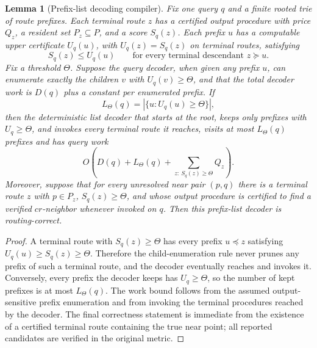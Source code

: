 \documentclass[10pt]{article}
\newtheorem{lemma}[theorem]{Lemma}
\theoremstyle{definition}
\begin{document}
\begin{lemma}[Prefix-list decoding compiler]
   \label{lem:prefix-list-decoder}
   Fix one query \(q\) and a finite rooted trie of route prefixes.  Each
   terminal route \(z\) has a certified output procedure with price \(Q_z\),
   a resident set \(P_z\subseteq P\), and a score \(S_q(z)\).  Each prefix
   \(u\) has a computable upper certificate \(U_q(u)\), with
   \(U_q(z)=S_q(z)\) on terminal routes, satisfying
   \[
      S_q(z)\le U_q(u)
      \qquad
      \text{for every terminal descendant }z\succeq u .
   \]
   Fix a threshold \(\Theta\).  Suppose the query decoder, when given any
   prefix \(u\), can enumerate exactly the children \(v\) with
   \(U_q(v)\ge\Theta\), and that the total decoder work is \(D(q)\) plus a
   constant per enumerated prefix.  If
   \[
      L_\Theta(q)=|\{u:U_q(u)\ge\Theta\}|,
   \]
   then the deterministic list decoder that starts at the root, keeps only
   prefixes with \(U_q\ge\Theta\), and invokes every terminal route it reaches,
   visits at most \(L_\Theta(q)\) prefixes and has query work
   \[
      O\left(D(q)+L_\Theta(q)+\sum_{z:\ S_q(z)\ge\Theta}Q_z\right).
   \]
   Moreover, suppose that for every unresolved near pair \((p,q)\) there is a
   terminal route \(z\) with \(p\in P_z\), \(S_q(z)\ge\Theta\), and whose
   output procedure is certified to find a verified \(cr\)-neighbor whenever
   invoked on \(q\).  Then this prefix-list decoder is routing-correct.
\end{lemma}

\begin{proof}
   A terminal route with \(S_q(z)\ge\Theta\) has every prefix \(u\preceq z\)
   satisfying \(U_q(u)\ge S_q(z)\ge\Theta\).  Therefore the child-enumeration
   rule never prunes any prefix of such a terminal route, and the decoder
   eventually reaches and invokes it.  Conversely, every prefix the decoder
   keeps has \(U_q\ge\Theta\), so the number of kept prefixes is at most
   \(L_\Theta(q)\).  The work bound follows from the assumed output-sensitive
   prefix enumeration and from invoking the terminal procedures reached by the
   decoder.  The final correctness statement is immediate from the existence
   of a certified terminal route containing the true near point; all reported
   candidates are verified in the original metric.
\end{proof}
\end{document}
